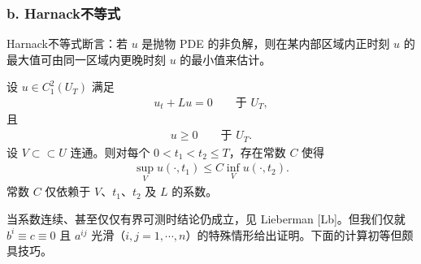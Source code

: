 \documentclass[../../main.tex]{subfiles}
\begin{document}
\subsubsection*{b. Harnack不等式}

Harnack不等式断言：若 $u$ 是抛物 PDE 的非负解，则在某内部区域内正时刻 $u$ 的最大值可由同一区域内更晚时刻 $u$ 的最小值来估计。

\begin{theorem}[抛物Harnack不等式。]\label{theorem:ch07-1-抛物Harnack不等式}设 $u\in C^2_1(U_T)$ 满足
\begin{align}
u_t+Lu=0\qquad \text{于 } U_T,\label{align:ch07-1-eq68}
\end{align}
且
\begin{align*}
u\geqslant 0\qquad \text{于 } U_T.
\end{align*}
设 $V\subset\subset U$ 连通。则对每个 $0<t_1<t_2\leqslant T$，存在常数 $C$ 使得
\begin{align}
\sup_V u(\cdot,t_1) \leqslant C\inf_V u(\cdot,t_2).\label{align:ch07-1-eq69}
\end{align}
常数 $C$ 仅依赖于 $V$、$t_1$、$t_2$ 及 $L$ 的系数。
\end{theorem}

当系数连续、甚至仅仅有界可测时结论仍成立，见 Lieberman [Lb]。但我们仅就 $b^i\equiv c\equiv 0$ 且 $a^{ij}$ 光滑（$i,j=1,\cdots,n$）的特殊情形给出证明。下面的计算初等但颇具技巧。
\end{document}
